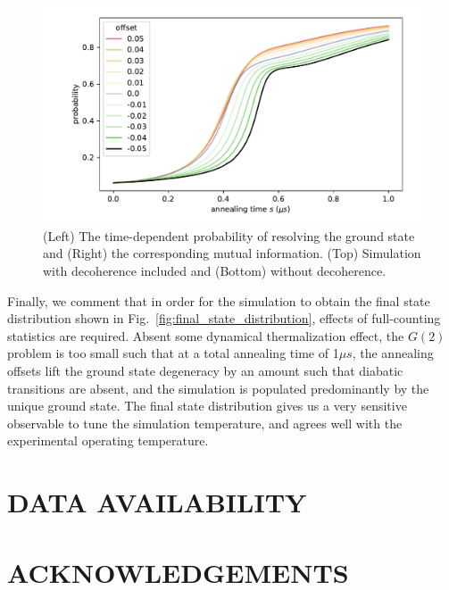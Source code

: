\documentclass[prd,twocolumn,tightenlines,preprintnumbers,showpacs,superscriptaddress,notitlepage,nofootinbib,eqsecnum,floatfix,longbibliography,aps,10pt]{revtex4-2}
\begin{document}
\begin{figure}
	\centering
	\includegraphics[width=\columnwidth]{./new_figures/time_dependent_probability.pdf}
	\caption{(Left) The time-dependent probability of resolving the ground state and (Right) the corresponding mutual information. (Top) Simulation with decoherence included and (Bottom) without decoherence.}
	\label{fig:td_prob}
\end{figure}

Finally, we comment that in order for the simulation to obtain the final state distribution shown in Fig.~\ref{fig:final_state_distribution}, effects of full-counting statistics are required.
Absent some dynamical thermalization effect, the $G(2)$ problem is too small such that at a total annealing time of 1$\mu s$, the annealing offsets lift the ground state degeneracy by an amount such that diabatic transitions are absent, and the simulation is populated predominantly by the unique ground state.
The final state distribution gives us a very sensitive observable to tune the simulation temperature, and agrees well with the experimental operating temperature.



\section{DATA AVAILABILITY}
\label{sec:open-source}


\section{ACKNOWLEDGEMENTS}
\end{document}
